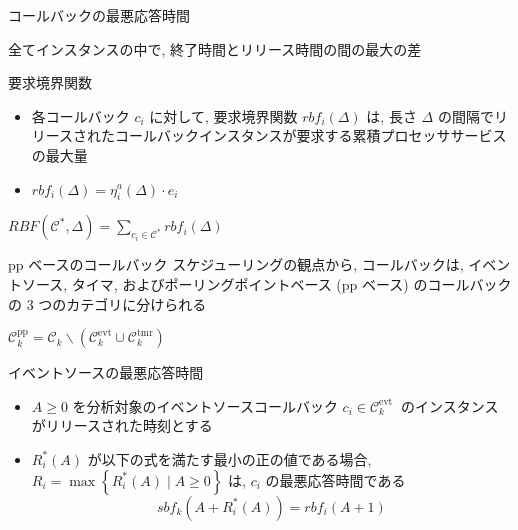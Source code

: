 \begin{frame}{コールバックの最悪応答時間}
    \begin{definition}
        全てインスタンスの中で, 終了時間とリリース時間の間の最大の差
    \end{definition}
\end{frame}

\begin{frame}{要求境界関数}
    \begin{definition}
        \setlength{\linewidth}{0.98\columnwidth}
        \begin{itemize}
            \item 各コールバック $c_{i}$ に対して, 要求境界関数 $rbf_{i}(\Delta)$ は, 長さ $\Delta$ の間隔でリリースされたコールバックインスタンスが要求する累積プロセッササービスの最大量
            \item $r b f_{i}(\Delta)=\eta_{i}^{a}(\Delta) \cdot e_{i}$
        \end{itemize}
    \end{definition}
    \begin{definition}
        $R B F\left(\mathcal{C}^{*}, \Delta\right)=\sum_{c_{i} \in \mathcal{C}^{*}} r b f_{i}(\Delta)$
    \end{definition}
\end{frame}

\begin{frame}{pp ベースのコールバック}
    スケジューリングの観点から, コールバックは, イベントソース, タイマ, およびポーリングポイントベース (pp ベース) のコールバックの 3 つのカテゴリに分けられる
    \begin{definition}
        $\mathcal{C}_{k}^{\mathrm{pp}}=\mathcal{C}_{k} \backslash\left(\mathcal{C}_{k}^{\text {evt}} \cup \mathcal{C}_{k}^{\mathrm{tmr}}\right)$
    \end{definition}
\end{frame}

\begin{frame}[label=lemma1]{イベントソースの最悪応答時間}
    \begin{lemma}[イベントソースの最悪応答時間]
        \begin{itemize}
            \item $A \geq 0$ を分析対象のイベントソースコールバック $c_{i} \in \mathcal{C}_{k}^{\text {evt }}$ のインスタンスがリリースされた時刻とする
            \item $R_{i}^{*}(A)$ が以下の式を満たす最小の正の値である場合, $R_{i}=\max \left\{R_{i}^{*}(A) \mid A \geq 0\right\}$ は, $c_{i}$ の最悪応答時間である
                  \begin{equation*}
                      s b f_{k}\left(A+R_{i}^{*}(A)\right)=r b f_{i}(A+1)
                  \end{equation*}
        \end{itemize}
    \end{lemma}
\end{frame}

